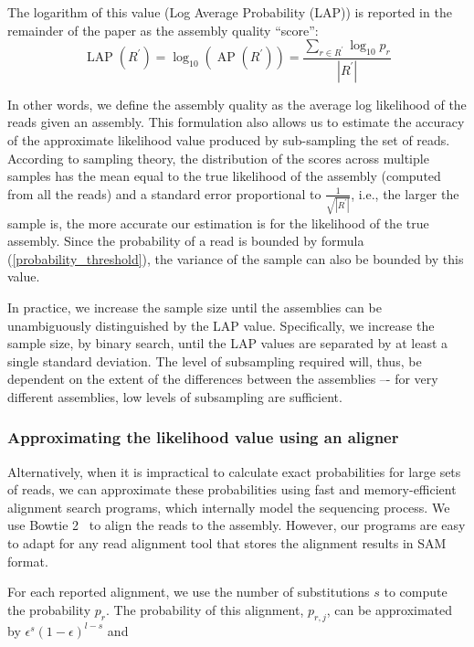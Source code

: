 The logarithm of this value (Log Average Probability (LAP)) is
reported in the remainder of the paper as the assembly quality ``score'':
\begin{equation}
  \label{average_log_probability}
  \operatorname{LAP}(R^\prime) = \log_{10} \left( \operatorname{AP}(R^\prime) \right) = \frac{\sum_{r \in R^\prime} \log_{10} p_r}{\left|R^\prime\right|}
\end{equation}

In other words, we define the assembly quality as the average log
likelihood of the reads given an assembly.  This formulation
also allows us to estimate the accuracy of the approximate likelihood
value produced by sub-sampling the set of reads.  According to
sampling theory, the distribution of the scores across multiple
samples has the mean equal to the true likelihood of the assembly
(computed from all the reads) and a standard error proportional to
$\frac{1}{\sqrt{\left|R^\prime\right|}}$, i.e., the larger the sample is,
the more accurate our estimation is for the likelihood of the true assembly.
Since the probability of a read is bounded by formula (\ref{probability_threshold}), the variance of the sample can also be bounded by this value.

In practice, we increase the sample size until the assemblies can be unambiguously distinguished by the LAP value.
Specifically, we increase the sample size, by binary search, until the LAP values are separated by at least a single standard deviation.  The level of subsampling required will, thus, be dependent on the extent of the differences between the assemblies –- for very different assemblies, low levels of subsampling are sufficient.

\subsubsection{Approximating the likelihood value using an aligner}
\label{methods_aligner}
Alternatively, when it is impractical to calculate exact probabilities
for large sets of reads, we can approximate these probabilities using
fast and memory-efficient alignment search programs, which internally
model the sequencing process.  We use Bowtie 2~\cite{langmead2012fast} to align the reads to
the assembly.  However, our programs are easy to adapt for any
read alignment tool that stores the alignment results in
SAM\cite{li2009sequence} format.

For each reported alignment, we use the number of substitutions $s$ to
compute the probability $p_{r}$.  The probability of this alignment, $p_{r,j}$,
can be approximated by $\epsilon^{s}(1 - \epsilon)^{l - s}$ and

